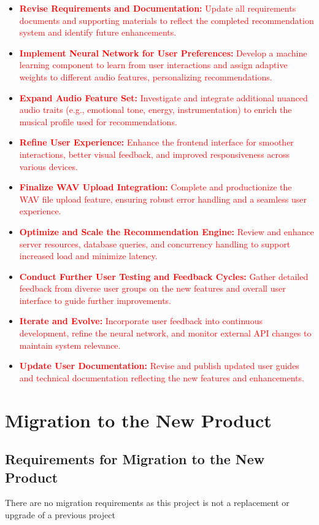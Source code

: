 \documentclass[12pt]{article}
\begin{document}
\begin{itemize}
    \item \textcolor{red}{\textbf{Revise Requirements and Documentation:} Update all requirements documents and supporting materials to reflect the completed recommendation system and identify future enhancements.}
    \item \textcolor{red}{\textbf{Implement Neural Network for User Preferences:} Develop a machine learning component to learn from user interactions and assign adaptive weights to different audio features, personalizing recommendations.}
    \item \textcolor{red}{\textbf{Expand Audio Feature Set:} Investigate and integrate additional nuanced audio traits (e.g., emotional tone, energy, instrumentation) to enrich the musical profile used for recommendations.}
    \item \textcolor{red}{\textbf{Refine User Experience:} Enhance the frontend interface for smoother interactions, better visual feedback, and improved responsiveness across various devices.}
    \item \textcolor{red}{\textbf{Finalize WAV Upload Integration:} Complete and productionize the WAV file upload feature, ensuring robust error handling and a seamless user experience.}
    \item \textcolor{red}{\textbf{Optimize and Scale the Recommendation Engine:} Review and enhance server resources, database queries, and concurrency handling to support increased load and minimize latency.}
    \item \textcolor{red}{\textbf{Conduct Further User Testing and Feedback Cycles:} Gather detailed feedback from diverse user groups on the new features and overall user interface to guide further improvements.}
    \item \textcolor{red}{\textbf{Iterate and Evolve:} Incorporate user feedback into continuous development, refine the neural network, and monitor external API changes to maintain system relevance.}
    \item \textcolor{red}{\textbf{Update User Documentation:} Revise and publish updated user guides and technical documentation reflecting the new features and enhancements.}
\end{itemize}

\section{Migration to the New Product}
\subsection{Requirements for Migration to the New Product}
There are no migration requirements as this project is not a replacement or upgrade of a previous project
\end{document}
